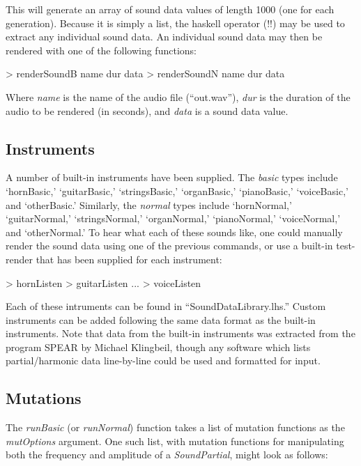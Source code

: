 \documentclass[11pt]{article}
\begin{document}
This will generate an array of sound data values of length 1000 (one for each generation). Because it is simply a list, the haskell operator (!!) may be used to extract any individual sound data. An individual sound data may then be rendered with one of the following functions:

\begin{code}
> renderSoundB name dur data
> renderSoundN name dur data
\end{code}

Where \emph{name} is the name of the audio file (``out.wav''), \emph{dur} is the duration of the audio to be rendered (in seconds), and \emph{data} is a sound data value.

\subsection{Instruments}

A number of built-in instruments have been supplied. The \emph{basic} types include `hornBasic,' `guitarBasic,' `stringsBasic,' `organBasic,' `pianoBasic,' `voiceBasic,' and `otherBasic.' Similarly, the \emph{normal} types include `hornNormal,' `guitarNormal,' `stringsNormal,' `organNormal,' `pianoNormal,' `voiceNormal,' and `otherNormal.' 
To hear what each of these sounds like, one could manually render the sound data using one of the previous commands, or use a built-in test-render that has been supplied for each instrument:

\begin{code}
> hornListen
> guitarListen
...
> voiceListen
\end{code}

Each of these intruments can be found in ``SoundDataLibrary.lhs.'' Custom instruments can be added following the same data format as the built-in instruments. Note that data from the built-in instruments was extracted from the program SPEAR by Michael Klingbeil\cite{klingbeil}, though any software which lists partial/harmonic data line-by-line could be used and formatted for input.

\subsection{Mutations}

The \emph{runBasic} (or \emph{runNormal}) function takes a list of mutation functions as the \emph{mutOptions} argument. One such list, with mutation functions for manipulating both the frequency and amplitude of a \emph{SoundPartial}, might look as follows:
\end{document}

